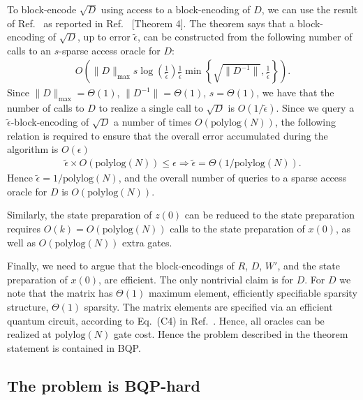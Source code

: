 \documentclass[superscriptaddress,onecolumn,nofootinbib,longbibliography,a4paper,accepted=2026-09-29]{quantumarticle}
\theoremstyle{plain}
\theoremstyle{definition}
\numberwithin{thm}{section}
\numberwithin{assumption}{section}
\numberwithin{lemma}{section}
\numberwithin{prop}{section}
\numberwithin{cor}{section}
\numberwithin{definition}{section}
\numberwithin{rmk}{section}
\numberwithin{equation}{section}
\begin{document}
To block-encode $\sqrt{D}$ using access to a block-encoding of $D$, we can use the result of Ref.~\cite{babbush2023exponential} as reported in Ref.~\cite{krovi2024quantum} [Theorem 4]. The theorem says that a block-encoding of $\sqrt{D}$, up to error $\tilde{\epsilon}$, can be constructed from the following number of calls to an $s$-sparse access oracle for $D$:
\begin{align}
O\left(\| D\|_{\mathrm{max}} s \log\left(\frac{1}{\tilde{\epsilon}}\right) \frac{1}{\tilde{\epsilon}} \min \left\{ \sqrt{\|D^{-1}\|}, \frac{1}{\tilde{\epsilon}} \right\} \right).
\end{align}
Since $\| D\|_{\mathrm{max}} = \Theta(1)$, $\| D^{-1}\| = \Theta(1)$, $s = \Theta(1)$, we have that the number of calls to $D$ to realize a single call to $\sqrt{D}$ is $O(1/\tilde{\epsilon})$. Since we query a $\tilde{\epsilon}$-block-encoding of $\sqrt{D}$ a number of times $O(\mathrm{polylog}(N))$, the following relation is required to ensure that the overall error accumulated during the algorithm is $O(\epsilon)$
\begin{align}
\tilde{\epsilon} \times O(\mathrm{polylog}(N)) \leq \epsilon \Rightarrow  \tilde{\epsilon}= \Theta(1/\mathrm{polylog}(N)).   
\end{align}
Hence $\tilde{\epsilon} = 1/ \mathrm{polylog}(N)$, and the overall number of queries to a sparse access oracle for $D$ is $O(\mathrm{polylog}(N))$. 

Similarly, the state preparation of $z(0)$ can be reduced to the state preparation requires $O(k) = O(\mathrm{polylog}(N))$ calls to the state preparation of $x(0)$, as well as $O(\mathrm{polylog}(N))$ extra gates.

Finally, we need to argue that the block-encodings of $R$, $D$, $W'$, and the state preparation of $x(0)$, are efficient. The only nontrivial claim is for $D$. For $D$ we note that the matrix has $\Theta(1)$ maximum element, efficiently specifiable sparsity structure, $\Theta(1)$ sparsity. The matrix elements are specified via an efficient quantum circuit, according to Eq.~(C4) in Ref.~\cite{babbush2023exponential}. Hence, all oracles can be realized at $\mathrm{polylog}(N)$ gate cost. Hence the problem described in the theorem statement is contained in BQP. 


\subsection{The problem is BQP-hard} 
\end{document}
